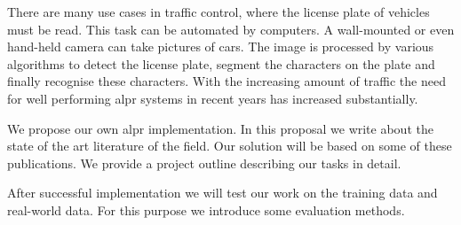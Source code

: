 
There are many use cases in traffic control, where the license plate of vehicles must be read. 
This task can be automated by computers. A wall-mounted or even hand-held camera can take pictures of cars.
The image is processed by various algorithms to detect the license plate, segment the characters on the plate and finally recognise these characters.
With the increasing amount of traffic the need for well performing \ac{alpr} systems in recent years has increased substantially.

We propose our own \ac{alpr} implementation.
In this proposal we write about the state of the art literature of the field.
Our solution will be based on some of these publications.
We provide a project outline describing our tasks in detail.

After successful implementation we will test our work on the training data and real-world data.
For this purpose we introduce some evaluation methods.










